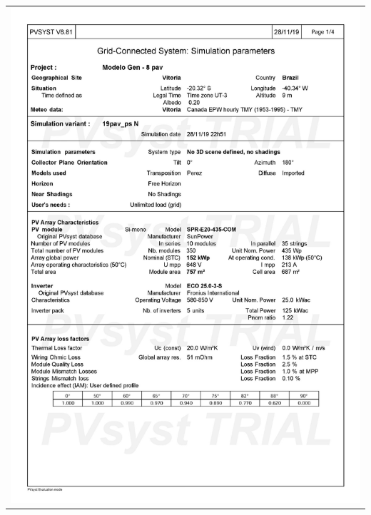 \begin{table}[H]
    \centering
    \begin{tabular}{l}
        \includegraphics[width=\textwidth]{figures/attachments/resultpv31.jpg}
    \end{tabular}
\end{table}
\pagebreak

